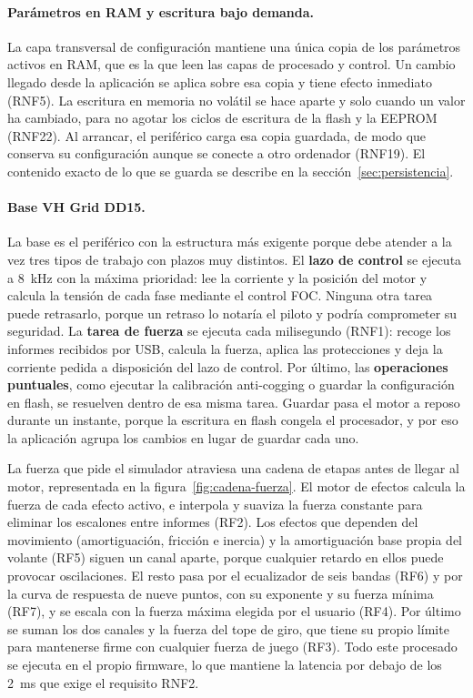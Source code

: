 \paragraph{Parámetros en RAM y escritura bajo demanda.}
La capa transversal de configuración mantiene una única copia de los parámetros activos en RAM, que es la que leen las capas de procesado y control. Un cambio llegado desde la aplicación se aplica sobre esa copia y tiene efecto inmediato (RNF5). La escritura en memoria no volátil se hace aparte y solo cuando un valor ha cambiado, para no agotar los ciclos de escritura de la flash y la EEPROM (RNF22). Al arrancar, el periférico carga esa copia guardada, de modo que conserva su configuración aunque se conecte a otro ordenador (RNF19). El contenido exacto de lo que se guarda se describe en la sección~\ref{sec:persistencia}.

\paragraph{Base VH Grid DD15.}
La base es el periférico con la estructura más exigente porque debe atender a la vez tres tipos de trabajo con plazos muy distintos. El \textbf{lazo de control} se ejecuta a 8~kHz con la máxima prioridad: lee la corriente y la posición del motor y calcula la tensión de cada fase mediante el control FOC. Ninguna otra tarea puede retrasarlo, porque un retraso lo notaría el piloto y podría comprometer su seguridad. La \textbf{tarea de fuerza} se ejecuta cada milisegundo (RNF1): recoge los informes recibidos por USB, calcula la fuerza, aplica las protecciones y deja la corriente pedida a disposición del lazo de control. Por último, las \textbf{operaciones puntuales}, como ejecutar la calibración anti-cogging o guardar la configuración en flash, se resuelven dentro de esa misma tarea. Guardar pasa el motor a reposo durante un instante, porque la escritura en flash congela el procesador, y por eso la aplicación agrupa los cambios en lugar de guardar cada uno.

La fuerza que pide el simulador atraviesa una cadena de etapas antes de llegar al motor, representada en la figura~\ref{fig:cadena-fuerza}. El motor de efectos calcula la fuerza de cada efecto activo, e interpola y suaviza la fuerza constante para eliminar los escalones entre informes (RF2). Los efectos que dependen del movimiento (amortiguación, fricción e inercia) y la amortiguación base propia del volante (RF5) siguen un canal aparte, porque cualquier retardo en ellos puede provocar oscilaciones. El resto pasa por el ecualizador de seis bandas (RF6) y por la curva de respuesta de nueve puntos, con su exponente y su fuerza mínima (RF7), y se escala con la fuerza máxima elegida por el usuario (RF4). Por último se suman los dos canales y la fuerza del tope de giro, que tiene su propio límite para mantenerse firme con cualquier fuerza de juego (RF3). Todo este procesado se ejecuta en el propio firmware, lo que mantiene la latencia por debajo de los 2~ms que exige el requisito RNF2.

